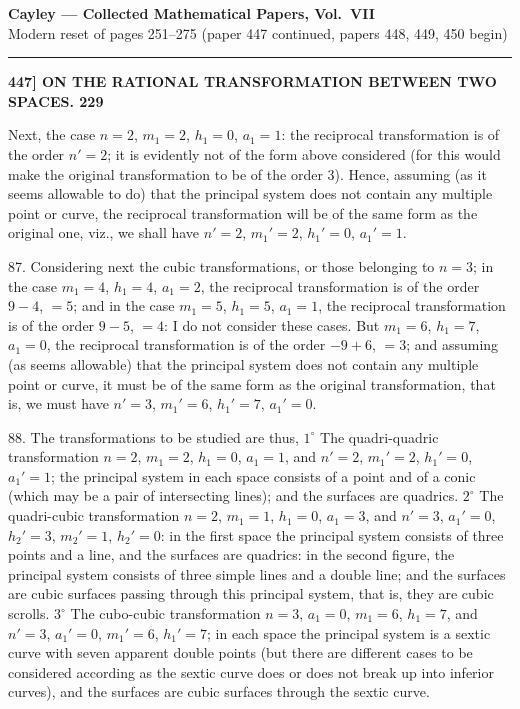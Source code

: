 \documentclass[11pt]{article}
\begin{document}
\begin{center}
{\large\bfseries Cayley --- Collected Mathematical Papers, Vol.\ VII}\\[2pt]
{\small Modern reset of pages 251--275 (paper 447 continued, papers 448, 449, 450 begin)}
\end{center}

\medskip
\hrule
\medskip

\noindent\textbf{447] \quad ON THE RATIONAL TRANSFORMATION BETWEEN TWO SPACES. \hfill 229}

\medskip

Next, the case $n=2$, $m_1=2$, $h_1=0$, $a_1=1$: the reciprocal transformation is of
the order $n'=2$; it is evidently not of the form above considered (for this would make
the original transformation to be of the order 3). Hence, assuming (as it seems
allowable to do) that the principal system does not contain any multiple point or
curve, the reciprocal transformation will be of the same form as the original one,
viz., we shall have $n'=2$, $m_1'=2$, $h_1'=0$, $a_1'=1$.

87. Considering next the cubic transformations, or those belonging to $n=3$; in
the case $m_1=4$, $h_1=4$, $a_1=2$, the reciprocal transformation is of the order $9-4$, $=5$;
and in the case $m_1=5$, $h_1=5$, $a_1=1$, the reciprocal transformation is of the order
$9-5$, $=4$: I do not consider these cases. But $m_1=6$, $h_1=7$, $a_1=0$, the reciprocal
transformation is of the order $-9+6$, $=3$; and assuming (as seems allowable) that the
principal system does not contain any multiple point or curve, it must be of the
same form as the original transformation, that is, we must have $n'=3$, $m_1'=6$, $h_1'=7$,
$a_1'=0$.

88. The transformations to be studied are thus, $1^\circ$ The quadri-quadric trans\-formation $n=2$, $m_1=2$, $h_1=0$, $a_1=1$, and $n'=2$, $m_1'=2$, $h_1'=0$, $a_1'=1$; the principal
system in each space consists of a point and of a conic (which may be a pair of
intersecting lines); and the surfaces are quadrics. $2^\circ$ The quadri-cubic transformation
$n=2$, $m_1=1$, $h_1=0$, $a_1=3$, and $n'=3$, $a_1'=0$, $h_2'=3$, $m_2'=1$, $h_2'=0$: in the first
space the principal system consists of three points and a line, and the surfaces are
quadrics: in the second figure, the principal system consists of three simple lines and a
double line; and the surfaces are cubic surfaces passing through this principal system,
that is, they are cubic scrolls. $3^\circ$ The cubo-cubic transformation $n=3$, $a_1=0$, $m_1=6$,
$h_1=7$, and $n'=3$, $a_1'=0$, $m_1'=6$, $h_1'=7$; in each space the principal system is a sextic
curve with seven apparent double points (but there are different cases to be considered
according as the sextic curve does or does not break up into inferior curves), and
the surfaces are cubic surfaces through the sextic curve.
\end{document}
